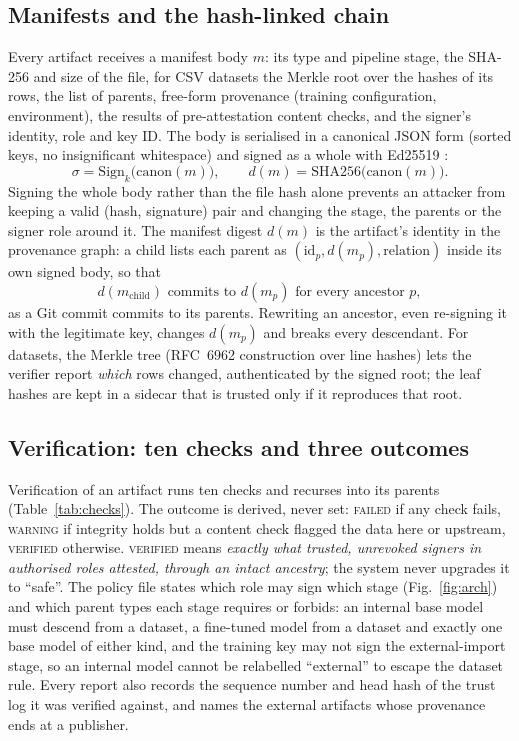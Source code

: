 \documentclass[conference]{IEEEtran}
\newcommand{\st}[1]{\textsc{#1}}
\begin{document}
\subsection{Manifests and the hash-linked chain}
Every artifact receives a manifest body $m$: its type and pipeline stage, the SHA-256 and size of the file, for CSV datasets the Merkle root over the hashes of its rows, the list of parents, free-form provenance (training configuration, environment), the results of pre-attestation content checks, and the signer's identity, role and key ID. The body is serialised in a canonical JSON form (sorted keys, no insignificant whitespace) and signed as a whole with Ed25519 \cite{rfc8032}:
\begin{equation}
\sigma = \mathrm{Sign}_{k}\bigl(\mathrm{canon}(m)\bigr),\qquad
d(m) = \mathrm{SHA256}\bigl(\mathrm{canon}(m)\bigr).
\label{eq:sign}
\end{equation}
Signing the whole body rather than the file hash alone prevents an attacker from keeping a valid (hash, signature) pair and changing the stage, the parents or the signer role around it. The manifest digest $d(m)$ is the artifact's identity in the provenance graph: a child lists each parent as $(\mathrm{id}_p, d(m_p), \mathrm{relation})$ inside its own signed body, so that
\begin{equation}
d(m_{\mathrm{child}}) \text{ commits to } d(m_p) \text{ for every ancestor } p,
\label{eq:chain}
\end{equation}
as a Git commit commits to its parents. Rewriting an ancestor, even re-signing it with the legitimate key, changes $d(m_p)$ and breaks every descendant. For datasets, the Merkle tree (RFC~6962 construction \cite{rfc6962} over line hashes) lets the verifier report \emph{which} rows changed, authenticated by the signed root; the leaf hashes are kept in a sidecar that is trusted only if it reproduces that root.

\subsection{Verification: ten checks and three outcomes}
Verification of an artifact runs ten checks and recurses into its parents (Table~\ref{tab:checks}). The outcome is derived, never set: \st{failed} if any check fails, \st{warning} if integrity holds but a content check flagged the data here or upstream, \st{verified} otherwise. \st{verified} means \emph{exactly what trusted, unrevoked signers in authorised roles attested, through an intact ancestry}; the system never upgrades it to ``safe''. The policy file states which role may sign which stage (Fig.~\ref{fig:arch}) and which parent types each stage requires or forbids: an internal base model must descend from a dataset, a fine-tuned model from a dataset and exactly one base model of either kind, and the training key may not sign the external-import stage, so an internal model cannot be relabelled ``external'' to escape the dataset rule. Every report also records the sequence number and head hash of the trust log it was verified against, and names the external artifacts whose provenance ends at a publisher.
\end{document}
